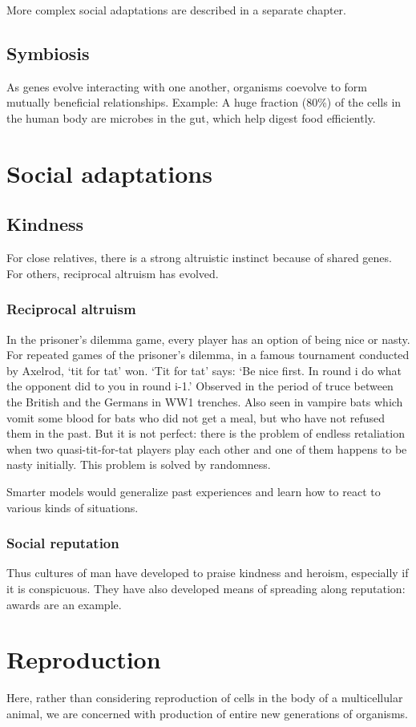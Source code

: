 \documentclass[oneside, article]{memoir}
\begin{document}
More complex social adaptations are described in a separate chapter.

\section{Symbiosis}
As genes evolve interacting with one another, organisms coevolve to form mutually beneficial relationships. Example: A huge fraction (80\%) of the cells in the human body are microbes in the gut, which help digest food efficiently.

\chapter{Social adaptations}
\section{Kindness}
For close relatives, there is a strong altruistic instinct because of shared genes. For others, reciprocal altruism has evolved.

\subsection{Reciprocal altruism}
In the prisoner’s dilemma game, every player has an option of being nice or nasty. For repeated games of the prisoner’s dilemma, in a famous tournament conducted by Axelrod, ‘tit for tat’ won. ‘Tit for tat’ says: ‘Be nice first. In round i do what the opponent did to you in round i-1.’ Observed in the period of truce between the British and the Germans in WW1 trenches. Also seen in vampire bats which vomit some blood for bats who did not get a meal, but who have not refused them in the past. But it is not perfect: there is the problem of endless retaliation when two quasi-tit-for-tat players play each other and one of them happens to be nasty initially. This problem is solved by randomness.

Smarter models would generalize past experiences and learn how to react to various kinds of situations.

\subsection{Social reputation}
Thus cultures of man have developed to praise kindness and heroism, especially if it is conspicuous. They have also developed means of spreading along reputation: awards are an example.

\chapter{Reproduction}
Here, rather than considering reproduction of cells in the body of a multicellular animal, we are concerned with production of entire new generations of organisms.
\end{document}

